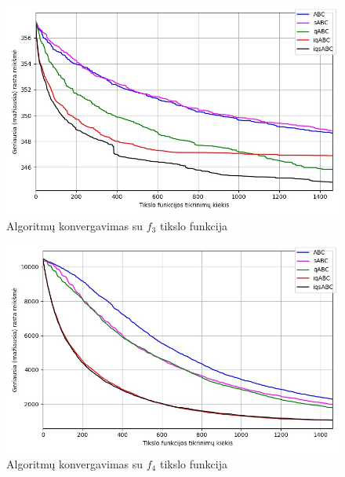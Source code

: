 \documentclass{VUMIFKompMagistrinis}
\begin{document}
\begin{landscape}
\begin{multicols}{2}
\begin{figure}[H]
    \centering
    \includegraphics[scale=0.45]{img/2kv/all_f3.jpg}
    \caption{Algoritmų konvergavimas su $f_{3}$ tikslo funkcija}
    \label{img:konf3}
\end{figure}


\begin{figure}[H]
    \centering
    \includegraphics[scale=0.45]{img/2kv/all_f4.jpg}
    \caption{Algoritmų konvergavimas su $f_{4}$ tikslo funkcija}
    \label{img:konf4}
\end{figure}






\end{multicols}
\begin{multicols}{2}


\end{multicols}
\end{landscape}
\end{document}
